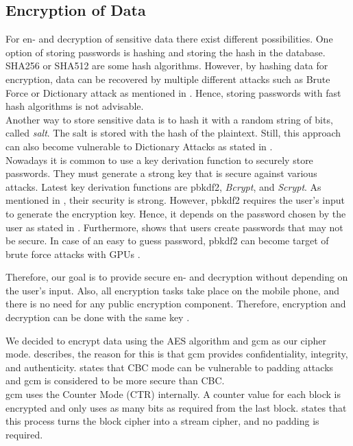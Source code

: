 \subsection{Encryption of Data}\label{arch_encryption}
For en- and decryption of sensitive data there exist different possibilities. One option of storing passwords is hashing and storing the hash in the database. SHA256 or SHA512 are some hash algorithms. However, by hashing data for encryption, data can be recovered by multiple different attacks such as Brute Force or Dictionary attack as mentioned in \cite{ertaul2016implementation}. Hence, storing passwords with fast hash algorithms is not advisable. \\
Another way to store sensitive data is to hash it with a random string of bits, called \textit{salt}. The salt is stored with the hash of the plaintext. Still, this approach can also become vulnerable to Dictionary Attacks as stated in \cite{3wrongways}. \\
Nowadays it is common to use a key derivation function to securely store passwords. They must generate a strong key that is secure against various attacks. Latest key derivation functions are \gls{pbkdf2}, \textit{Bcrypt}, and \textit{Scrypt}. As mentioned in \cite{ertaul2016implementation}, their security is strong.
However, \gls{pbkdf2} requires the user's input to generate the encryption key. Hence, it depends on the password chosen by the user as stated in \cite{Agilebits}. Furthermore, \cite{YanBAG04} shows that users create passwords that may not be secure. In case of an easy to guess password, \gls{pbkdf2} can become target of brute force attacks with GPUs \cite{DurmuthGKPYZ12}.

Therefore, our goal is to provide secure en- and decryption without depending on the user's input. Also, all encryption tasks take place on the mobile phone, and there is no need for any public encryption component. Therefore, encryption and decryption can be done with the same key \cite{ElminaamKH10}.


We decided to encrypt data using the AES algorithm and \gls{gcm} as our cipher mode. \cite{AESJavaAndroid} describes, the reason for this is that \gls{gcm} provides confidentiality, integrity, and authenticity. \cite{GCMSecure} states that CBC mode can be vulnerable to padding attacks and \gls{gcm} is considered to be more secure than CBC. \\ 

\gls{gcm} uses the Counter Mode (CTR) internally. A counter value for each block is encrypted and only uses as many bits as required from the last block. \cite{IVtransmission} states that this process turns the block cipher into a stream cipher, and no padding is required. 

